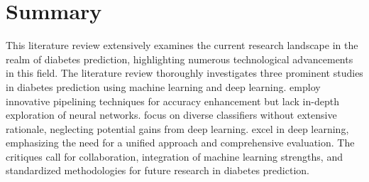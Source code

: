 \section{Summary} 
This literature review extensively examines the current research landscape in the realm of diabetes prediction, highlighting numerous technological advancements in this field. The literature review thoroughly investigates three prominent studies in diabetes prediction using machine learning and deep learning. \cite{mujumdar2019diabetes} employ innovative pipelining techniques for accuracy enhancement but lack in-depth exploration of neural networks. \cite{soni2020diabetes} focus on diverse classifiers without extensive rationale, neglecting potential gains from deep learning. \cite{swapna2018diabetes} \cite {kamble2016diabetes} excel in deep learning, emphasizing the need for a unified approach and comprehensive evaluation. The critiques call for collaboration, integration of machine learning strengths, and standardized methodologies for future research in diabetes prediction.
~\\
